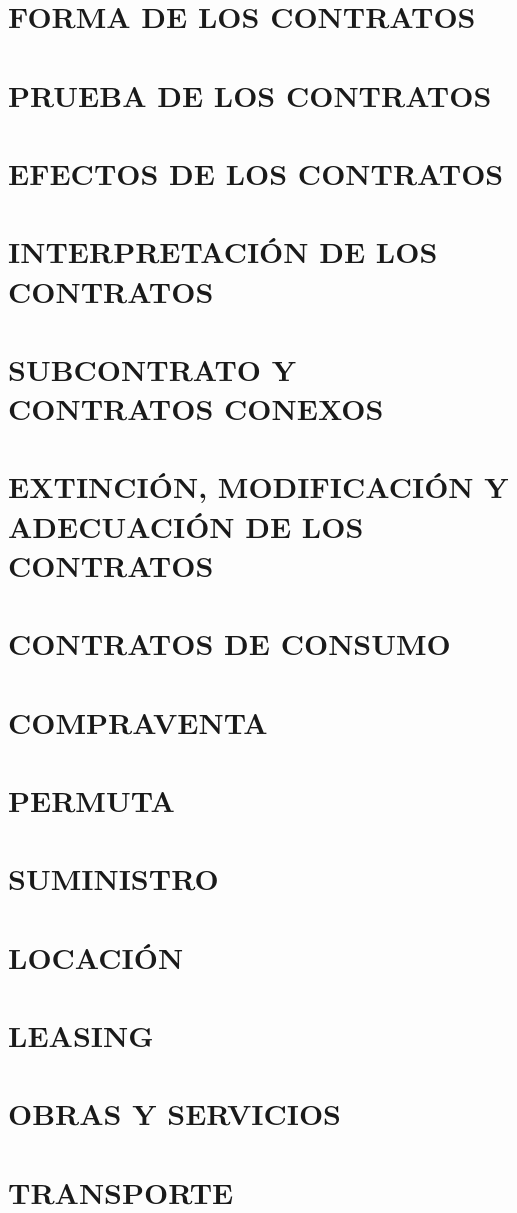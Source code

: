 \documentclass[12pt]{book}
\begin{document}
\chapter{FORMA DE LOS CONTRATOS}
\chapter{PRUEBA DE LOS CONTRATOS}
\chapter{EFECTOS DE LOS CONTRATOS}
\chapter{INTERPRETACIÓN DE LOS CONTRATOS}
\chapter{SUBCONTRATO Y CONTRATOS CONEXOS}
\chapter{EXTINCIÓN, MODIFICACIÓN Y ADECUACIÓN DE LOS CONTRATOS}
\chapter{CONTRATOS DE CONSUMO}
\chapter{COMPRAVENTA}
\chapter{PERMUTA}
\chapter{SUMINISTRO}
\chapter{LOCACIÓN}
\chapter{LEASING}
\chapter{OBRAS Y SERVICIOS}
\chapter{TRANSPORTE}
\end{document}
